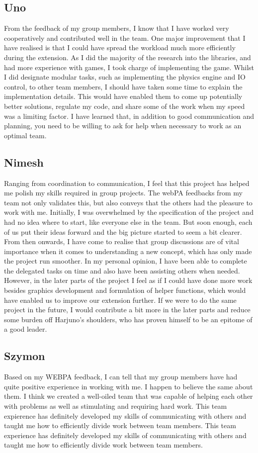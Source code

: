 \documentclass[11pt]{article}
\begin{document}
\subsection{Uno}
From the feedback of my group members, I know that I have worked very cooperatively and contributed well in the team. One major improvement that I have realised is that I could have spread the workload much more efficiently during the extension. As I did the majority of the research into the libraries, and had more experience with games, I took charge of implementing the game. Whilst I did designate modular tasks, such as implementing the physics engine and IO control, to other team members, I should have taken some time to explain the implementation details. This would have enabled them to come up potentially better solutions, regulate my code, and share some of the work when my speed was a limiting factor. I have learned that, in addition to good communication and planning, you need to be willing to ask for help when necessary to work as an optimal team.
\subsection{Nimesh}
Ranging from coordination to communication, I feel that this project has helped me polish my skills required in group projects. The webPA feedbacks from my team not only validates this, but also conveys that the others had the pleasure to work with me. Initially, I was overwhelmed by the specification of the project and had no idea where to start, like everyone else in the team. But soon enough, each of us put their ideas forward and the big picture started to seem a bit clearer. From then onwards, I have come to realise that group discussions are of vital importance when it comes to understanding a new concept, which has only made the project run smoother. In my personal opinion, I have been able to complete the delegated tasks on time and also have been assisting others when needed. However, in the later parts of the project I feel as if I could have done more work besides graphics development and formulation of helper functions, which would have enabled us to improve our extension further. If we were to do the same project in the future, I would contribute a bit more in the later parts and reduce some burden off Harjuno's shoulders, who has proven himself to be an epitome of a good leader.
\subsection{Szymon}
Based on my WEBPA feedback, I can tell that my group members have had quite positive experience in working with me. I happen to believe the same about them. I think we created a well-oiled team that was capable of helping each other with problems as well as stimulating and requiring hard work. This team expierence has definitely developed my skills of communicating with others and taught me how to efficiently divide work between team members. This team experience has definitely developed my skills of communicating with others and taught me how to efficiently divide work between team members.
\end{document}
